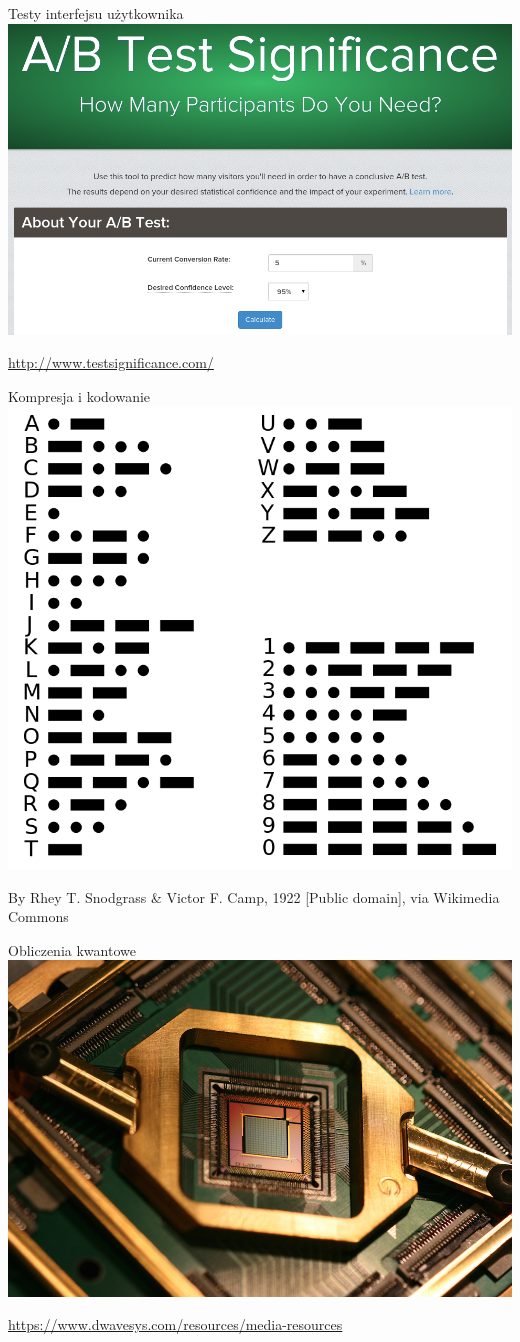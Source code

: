 \documentclass{mp}
\begin{document}
\begin{frame}{Testy interfejsu użytkownika}
\centering\includegraphics[width=.9\textwidth]{ab.png}

{\tiny \url{http://www.testsignificance.com/}}
\end{frame}
\begin{frame}{Kompresja i kodowanie}
\centering\includegraphics[width=.7\textwidth]{morse.png}

{\tiny By Rhey T. Snodgrass \& Victor F. Camp, 1922 [Public domain], via Wikimedia Commons}
\end{frame}

\begin{frame}{Obliczenia kwantowe}
\centering\includegraphics[width=.9\textwidth]{qc.jpeg}

\vfill
{\tiny \url{https://www.dwavesys.com/resources/media-resources}}
\end{frame}
\end{document}
